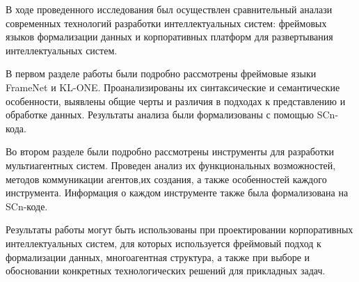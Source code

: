 
В ходе проведенного исследования был осуществлен сравнительный аналази современных технологий разработки интеллектуальных систем: фреймовых языков формализации данных и корпоративных платформ для развертывания интеллектуальных систем.

В первом разделе работы были подробно рассмотрены фреймовые языки FrameNet и KL-ONE. Проанализированы их синтаксические и семантические особенности,  выявлены общие черты и различия в подходах к представлению и обработке данных. Результаты анализа были формализованы с помощью SCn-кода.

Во втором разделе были подробно рассмотрены инструменты для разработки мультиагентных систем. Проведен анализ их функциональных возможностей, методов коммуникации агентов,их создания, а также особенностей каждого инструмента. Информация о каждом инструменте также была формализована на SCn-коде.

Результаты работы могут быть использованы при проектировании корпоративных интеллектуальных систем, для которых используется фреймовый подход к формализации данных, многоагентная структура, а также при выборе и обосновании конкретных технологических решений для прикладных задач.